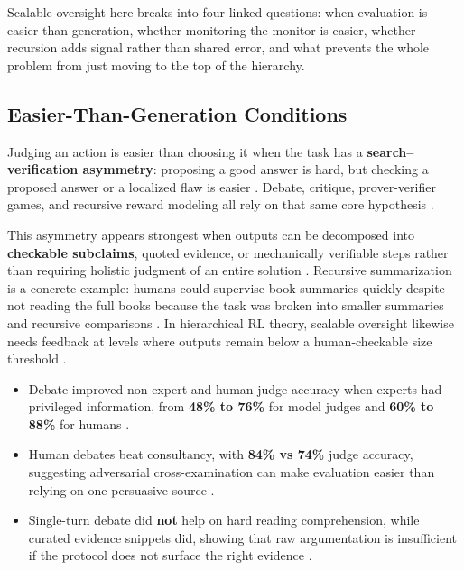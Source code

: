 Scalable oversight here breaks into four linked questions: when evaluation is easier than generation, whether monitoring the monitor is easier, whether recursion adds signal rather than shared error, and what prevents the whole problem from just moving to the top of the hierarchy.


\subsection*{Easier-Than-Generation Conditions}


Judging an action is easier than choosing it when the task has a \textbf{search–verification asymmetry}: proposing a good answer is hard, but checking a proposed answer or a localized flaw is easier  \cite{Irving2018AI} \cite{Khan2024Debating} \cite{Kirchner2024Prover-Verifier}. Debate, critique, prover-verifier games, and recursive reward modeling all rely on that same core hypothesis  \cite{Bowman2022Measuring} \cite{Recchia2025FindTheFlaws:}.


This asymmetry appears strongest when outputs can be decomposed into \textbf{checkable subclaims}, quoted evidence, or mechanically verifiable steps rather than requiring holistic judgment of an entire solution  \cite{Irving2018AI} \cite{Kirchner2024Prover-Verifier}. Recursive summarization is a concrete example: humans could supervise book summaries quickly despite not reading the full books because the task was broken into smaller summaries and recursive comparisons  \cite{Wu2021Recursively}. In hierarchical RL theory, scalable oversight likewise needs feedback at levels where outputs remain below a human-checkable size threshold  \cite{Yan2024A}.


\begin{itemize}
\item Debate improved non-expert and human judge accuracy when experts had privileged information, from \textbf{48\% to 76\%} for model judges and \textbf{60\% to 88\%} for humans  \cite{Khan2024Debating}.
\item Human debates beat consultancy, with \textbf{84\% vs 74\%} judge accuracy, suggesting adversarial cross-examination can make evaluation easier than relying on one persuasive source  \cite{Michael2023Debate}.
\item Single-turn debate did \textbf{not} help on hard reading comprehension, while curated evidence snippets did, showing that raw argumentation is insufficient if the protocol does not surface the right evidence  \cite{Parrish2022Single-Turn}.
\end{itemize}


